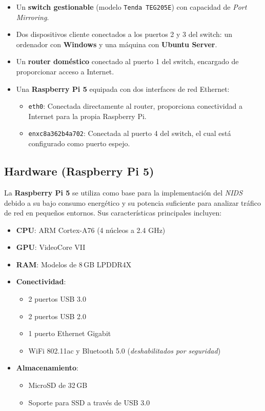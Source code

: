 \documentclass[11pt,a4paper,twoside]{report}
\begin{document}
\begin{itemize}
	\item Un \textbf{switch gestionable} (modelo \texttt{Tenda TEG205E}) con capacidad de \textit{Port Mirroring}.
	\item Dos dispositivos cliente conectados a los puertos 2 y 3 del switch: un ordenador con \textbf{Windows} y una máquina con \textbf{Ubuntu Server}.
	\item Un \textbf{router doméstico} conectado al puerto 1 del switch, encargado de proporcionar acceso a Internet.
	\item Una \textbf{Raspberry Pi 5} equipada con dos interfaces de red Ethernet:
	\begin{itemize}
		\item \texttt{eth0}: Conectada directamente al router, proporciona conectividad a Internet para la propia Raspberry Pi.
		\item \texttt{enxc8a362b4a702}: Conectada al puerto 4 del switch, el cual está configurado como puerto espejo.
	\end{itemize}
\end{itemize}

\subsection{Hardware (Raspberry Pi 5)}

La \textbf{Raspberry Pi 5} se utiliza como base para la implementación del \textit{NIDS} debido a su bajo consumo energético y su potencia suficiente para analizar tráfico de red en pequeños entornos. Sus características principales incluyen:

\begin{itemize}
	\item \textbf{CPU}: ARM Cortex-A76 (4 núcleos a 2.4 GHz)
	\item \textbf{GPU}: VideoCore VII
	\item \textbf{RAM}: Modelos de 8\,GB LPDDR4X
	\item \textbf{Conectividad}:
	\begin{itemize}
		\item 2 puertos USB 3.0
		\item 2 puertos USB 2.0
		\item 1 puerto Ethernet Gigabit
		\item WiFi 802.11ac y Bluetooth 5.0 (\textit{deshabilitados por seguridad})
	\end{itemize}
	\item \textbf{Almacenamiento}:
	\begin{itemize}
		\item MicroSD de 32\,GB
		\item Soporte para SSD a través de USB 3.0
	\end{itemize}
\end{itemize}
\end{document}
